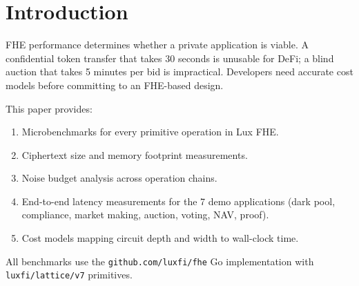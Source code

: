 \section{Introduction}


FHE performance determines whether a private application is viable. A confidential token transfer that takes 30 seconds is unusable for DeFi; a blind auction that takes 5 minutes per bid is impractical. Developers need accurate cost models before committing to an FHE-based design.

This paper provides:
\begin{enumerate}
\item Microbenchmarks for every primitive operation in Lux FHE.
\item Ciphertext size and memory footprint measurements.
\item Noise budget analysis across operation chains.
\item End-to-end latency measurements for the 7 demo applications (dark pool, compliance, market making, auction, voting, NAV, proof).
\item Cost models mapping circuit depth and width to wall-clock time.
\end{enumerate}

All benchmarks use the \texttt{github.com/luxfi/fhe} Go implementation with \texttt{luxfi/lattice/v7} primitives.

